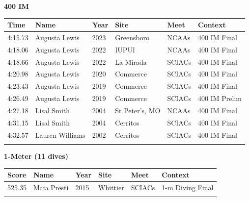 \noindent\begin{minipage}[t]{0.98\textwidth}
\centering
\textbf{\textcolor{teamprimary}{400 IM}}\par
\vspace{0.5em}
\centering
\small
\renewcommand{\arraystretch}{1.0}
\setlength{\tabcolsep}{4pt}
\begin{tabular}{@{}p{2.0cm}p{3.2cm}p{1.2cm}p{2.0cm}p{2.0cm}p{2.5cm}@{}}
\toprule
\textbf{Time} & \textbf{Name} & \textbf{Year} & \textbf{Site} & \textbf{Meet} & \textbf{Context} \\
\midrule
4:15.73 & Augusta Lewis & 2023 & Greensboro & NCAAs & 400 IM Final \\
4:18.06 & Augusta Lewis & 2022 & IUPUI & NCAAs & 400 IM Final \\
4:18.66 & Augusta Lewis & 2022 & La Mirada & SCIACs & 400 IM Final \\
4:20.98 & Augusta Lewis & 2020 & Commerce & SCIACs & 400 IM Final \\
4:23.43 & Augusta Lewis & 2019 & Commerce & SCIACs & 400 IM Final \\
4:26.49 & Augusta Lewis & 2019 & Commerce & SCIACs & 400 IM Prelim \\
4:27.18 & Lisal Smith & 2004 & St Peter's, MO & NCAAs & 400 IM Final \\
4:31.15 & Lisal Smith & 2004 & Cerritos & SCIACs & 400 IM Final \\
4:32.57 & Lauren Williams & 2002 & Cerritos & SCIACs & 400 IM Final \\
\bottomrule
\vspace{0.5em}
\end{tabular}
\end{minipage}
\vspace{1.2em}
\noindent\begin{minipage}[t]{0.98\textwidth}
\centering
\textbf{\textcolor{teamprimary}{1-Meter (11 dives)}}\par
\vspace{0.5em}
\centering
\small
\renewcommand{\arraystretch}{1.0}
\setlength{\tabcolsep}{4pt}
\begin{tabular}{@{}p{2.0cm}p{3.2cm}p{1.2cm}p{2.0cm}p{2.0cm}p{2.5cm}@{}}
\toprule
\textbf{Score} & \textbf{Name} & \textbf{Year} & \textbf{Site} & \textbf{Meet} & \textbf{Context} \\
\midrule
525.35 & Maia Presti & 2015 & Whittier & SCIACs & 1-m Diving Final \\
\bottomrule
\vspace{0.5em}
\end{tabular}
\end{minipage}
